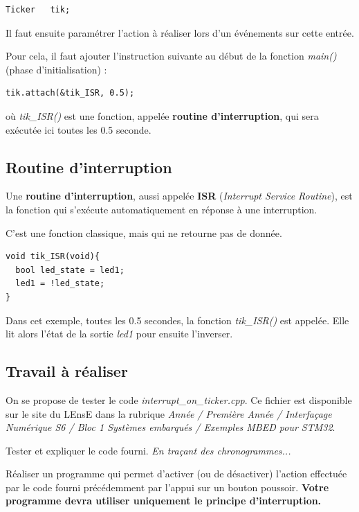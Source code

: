 \documentclass[a4paper,11pt,titlepage]{article} %
\begin{document}
\begin{lstlisting}
Ticker   tik;
\end{lstlisting}

\medskip

Il faut ensuite paramétrer l'action à réaliser lors d'un événements sur cette entrée.

Pour cela, il faut ajouter l'instruction suivante au début de la fonction \textsl{main()} (phase d'initialisation) :

\begin{lstlisting}
tik.attach(&tik_ISR, 0.5);
\end{lstlisting}

où \textsl{tik\_ISR()} est une fonction, appelée \textbf{routine d'interruption}, qui sera exécutée ici toutes les 0.5 seconde.

\subsection{Routine d'interruption}

Une \textbf{routine d'interruption}, aussi appelée \textbf{ISR} (\textit{Interrupt Service Routine}), est la fonction qui s'exécute automatiquement en réponse à une interruption. 

C'est une fonction classique, mais qui ne retourne pas de donnée.

\begin{lstlisting}
void tik_ISR(void){
  bool led_state = led1;
  led1 = !led_state;
} 
\end{lstlisting}

Dans cet exemple, toutes les 0.5 secondes, la fonction \textsl{tik\_ISR()} est appelée. Elle lit alors l'état de la sortie \textsl{led1} pour ensuite l'inverser.

\subsection{Travail à réaliser}

On se propose de tester le code \textsl{interrupt\_on\_ticker.cpp}. Ce fichier est disponible sur le site du LEnsE dans la rubrique \textit{Année / Première Année / Interfaçage Numérique S6 / Bloc 1 Systèmes embarqués / Exemples MBED pour STM32}.

\Manip Tester et expliquer le code fourni. \textit{En traçant des chronogrammes...}

\Manip Réaliser un programme qui permet d'activer (ou de désactiver) l'action effectuée par le code fourni précédemment par l'appui sur un bouton poussoir. \textbf{Votre programme devra utiliser uniquement le principe d'interruption.}
\end{document}
